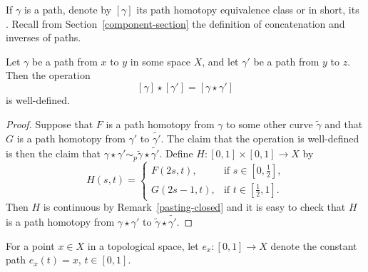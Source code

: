 If $\gamma$ is a path, denote by $[\gamma]$ its path homotopy equivalence class or in short, its . Recall from Section~\ref{component-section} the definition of concatenation and inverses of paths.
\begin{prop}
  Let $\gamma$ be a path from $x$ to $y$ in some space $X$, and let $\gamma'$ be a path from $y$ to $z$. Then the operation
  \[
    [\gamma] \star [\gamma'] = [\gamma \star \gamma']
  \]
  is well-defined.
\end{prop}
\begin{proof}
  Suppose that $F$ is a path homotopy from $\gamma$ to some other curve $\tilde{\gamma}$ and that $G$ is a path homotopy from $\gamma'$ to $\widetilde{\gamma'}$. The claim that the operation is well-defined is then the claim that $\gamma \star \gamma' \sim_p \tilde{\gamma} \star \widetilde{\gamma'}$. Define $H : [0,1] \times [0,1] \to X$ by
  \[
    H(s,t) = \begin{cases} F(2s,t),& \text{if $s \in [0,\tfrac{1}{2}]$,} \\G(2s-1,t), & \text{if $t \in [\tfrac{1}{2},1]$.} \end{cases}
  \]
  Then $H$ is continuous by Remark~\ref{pasting-closed} and it is easy to check that $H$ is a path homotopy from $\gamma \star \gamma'$ to $\tilde{\gamma} \star \widetilde{\gamma'}$.
\end{proof}
For a point $x \in X$ in a topological space, let $e_x : [0,1] \to X$ denote the constant path $e_x(t) = x$, $t \in [0,1]$.

